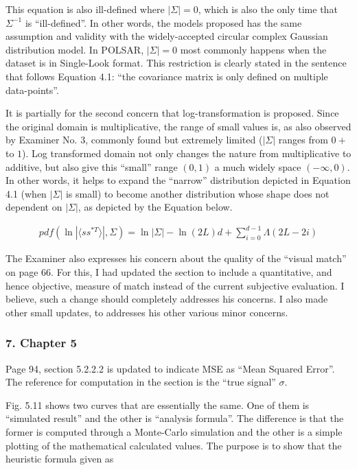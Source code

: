 This equation is also ill-defined where $|\Sigma|=0$, which is also the only time that $\Sigma^{-1}$ is ``ill-defined''.
In other words, the models proposed has the same assumption and validity with the widely-accepted circular complex Gaussian distribution model.
In POLSAR, $|\Sigma|=0$ most commonly happens when the dataset is in Single-Look format.
This restriction is clearly stated in the sentence that follows Equation 4.1: ``the covariance matrix is only defined on multiple data-points''.

It is partially for the second concern that log-transformation is proposed.
Since the original domain is multiplicative, the range of small values is, as also observed by Examiner No. 3, commonly found but extremely limited ($|\Sigma|$ ranges from $0+$ to $1$).
Log transformed domain not only changes the nature from multiplicative to additive, but also give this ``small'' range $(0,1)$ a much widely space $(-\infty,0)$.
In other words, it helps to expand the ``narrow'' distribution depicted in Equation 4.1 (when $|\Sigma|$ is small) to become another distribution whose shape does not dependent on $|\Sigma|$, as depicted by the Equation below.

\begin{align*}
  pdf( \ln | \langle ss^{*T} \rangle|, \Sigma) = \ln |\Sigma| - \ln(2L)d + \sum^{d-1}_{i=0} \Lambda (2L-2i)
\end{align*}  

The Examiner also expresses his concern about the quality of the ``visual match'' on page 66.
For this, I had updated the section to include a quantitative, and hence objective, measure of match instead of the current subjective evaluation.
I believe, such a change should completely addresses his concerns.
I also made other small updates, to addresses his other various minor concerns.

\subsubsection*{7. Chapter 5}

Page 94, section 5.2.2.2 is updated to indicate MSE as ``Mean Squared Error''.
The reference for computation in the section is the ``true signal'' $\sigma$.

Fig. 5.11 shows two curves that are essentially the same.
One of them is ``simulated result'' and the other is ``analysis formula''.
The difference is that the former is computed through a Monte-Carlo simulation and the other is a simple plotting of the mathematical calculated values.
The purpose is to show that the heuristic formula given as

